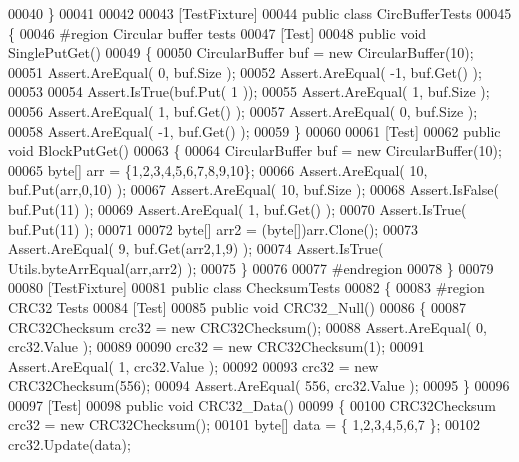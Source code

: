 \begin{DoxyCode}
00040     \}
00041 
00042 
00043     [TestFixture]
00044     \textcolor{keyword}{public} \textcolor{keyword}{class }CircBufferTests
00045     \{
00046 \textcolor{preprocessor}{        #region Circular buffer tests}
00047         [Test]
00048         \textcolor{keyword}{public} \textcolor{keywordtype}{void} SinglePutGet()
00049         \{
00050             CircularBuffer buf = \textcolor{keyword}{new} CircularBuffer(10);
00051             Assert.AreEqual( 0, buf.Size );
00052             Assert.AreEqual( -1, buf.Get() );
00053 
00054             Assert.IsTrue(buf.Put( 1 ));
00055             Assert.AreEqual( 1, buf.Size );
00056             Assert.AreEqual( 1, buf.Get() );
00057             Assert.AreEqual( 0, buf.Size );
00058             Assert.AreEqual( -1, buf.Get() );
00059         \}
00060 
00061         [Test]
00062         \textcolor{keyword}{public} \textcolor{keywordtype}{void} BlockPutGet()
00063         \{
00064             CircularBuffer buf = \textcolor{keyword}{new} CircularBuffer(10);
00065             byte[] arr = \{1,2,3,4,5,6,7,8,9,10\};
00066             Assert.AreEqual( 10, buf.Put(arr,0,10) );
00067             Assert.AreEqual( 10, buf.Size );
00068             Assert.IsFalse( buf.Put(11) );
00069             Assert.AreEqual( 1, buf.Get() );
00070             Assert.IsTrue( buf.Put(11) );
00071 
00072             byte[] arr2 = (byte[])arr.Clone();
00073             Assert.AreEqual( 9, buf.Get(arr2,1,9) );
00074             Assert.IsTrue( Utils.byteArrEqual(arr,arr2) );
00075         \}
00076 
00077 \textcolor{preprocessor}{        #endregion}
00078     \}
00079 
00080     [TestFixture]
00081     \textcolor{keyword}{public} \textcolor{keyword}{class }ChecksumTests
00082     \{
00083 \textcolor{preprocessor}{        #region CRC32 Tests}
00084         [Test]
00085         \textcolor{keyword}{public} \textcolor{keywordtype}{void} CRC32\_Null()
00086         \{
00087             CRC32Checksum crc32 = \textcolor{keyword}{new} CRC32Checksum();
00088             Assert.AreEqual( 0, crc32.Value );
00089 
00090             crc32 = \textcolor{keyword}{new} CRC32Checksum(1);
00091             Assert.AreEqual( 1, crc32.Value );
00092 
00093             crc32 = \textcolor{keyword}{new} CRC32Checksum(556);
00094             Assert.AreEqual( 556, crc32.Value );
00095         \}
00096 
00097         [Test]
00098         \textcolor{keyword}{public} \textcolor{keywordtype}{void} CRC32\_Data()
00099         \{
00100             CRC32Checksum crc32 = \textcolor{keyword}{new} CRC32Checksum();
00101             byte[] data = \{ 1,2,3,4,5,6,7 \};
00102             crc32.Update(data);

\end{DoxyCode}
